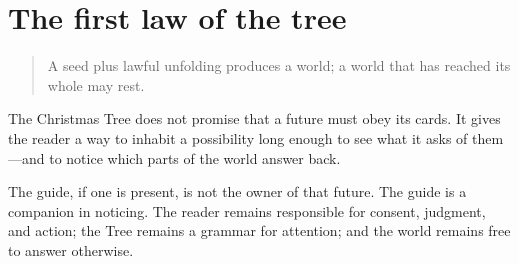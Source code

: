 \section{The first law of the tree}

\begin{quote}
A seed plus lawful unfolding produces a world; a world that has reached its
whole may rest.
\end{quote}

The Christmas Tree does not promise that a future must obey its cards. It gives
the reader a way to inhabit a possibility long enough to see what it asks of
them—and to notice which parts of the world answer back.

The guide, if one is present, is not the owner of that future. The guide is a
companion in noticing. The reader remains responsible for consent, judgment,
and action; the Tree remains a grammar for attention; and the world remains
free to answer otherwise.
